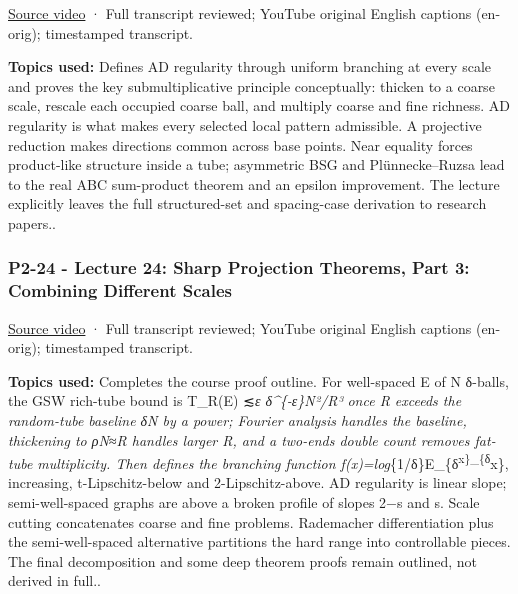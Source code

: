 \hypertarget{04-visual-computing-ii-ch036-p2-23---lecture-23-sharp-projection-theorems-part-2-ad-regular-case}{}

\href{https://www.youtube.com/watch?v=I6ZSrgxiofs}{Source video} · Full transcript reviewed; YouTube original English captions (en-orig); timestamped transcript.

\textbf{Topics used:} Defines AD regularity through uniform branching at every scale and proves the key submultiplicative principle conceptually: thicken to a coarse scale, rescale each occupied coarse ball, and multiply coarse and fine richness. AD regularity is what makes every selected local pattern admissible. A projective reduction makes directions common across base points. Near equality forces product-like structure inside a tube; asymmetric BSG and Plünnecke--Ruzsa lead to the real ABC sum-product theorem and an epsilon improvement. The lecture explicitly leaves the full structured-set and spacing-case derivation to research papers..

\subsubsection{P2-24 - Lecture 24: Sharp Projection Theorems, Part 3: Combining Different Scales}\label{04-visual-computing-ii-ch036-p2-24---lecture-24-sharp-projection-theorems-part-3-combining-different-scales}

\hypertarget{04-visual-computing-ii-ch036-p2-24---lecture-24-sharp-projection-theorems-part-3-combining-different-scales}{}

\href{https://www.youtube.com/watch?v=h0Ln82BR4R0}{Source video} · Full transcript reviewed; YouTube original English captions (en-orig); timestamped transcript.

\textbf{Topics used:} Completes the course proof outline. For well-spaced E of N δ-balls, the GSW rich-tube bound is \textbar T\_R(E)\textbar{} ≲\emph{ε δ\^{}\{-ε\}N²/R³ once R exceeds the random-tube baseline δN by a power; Fourier analysis handles the baseline, thickening to ρN≈R handles larger R, and a two-ends double count removes fat-tube multiplicity. Then defines the branching function f(x)=log}\{1/δ\}\textbar E\_\{δ\textsuperscript{x\}\textbar\_\{δ}x\}, increasing, t-Lipschitz-below and 2-Lipschitz-above. AD regularity is linear slope; semi-well-spaced graphs are above a broken profile of slopes 2−s and s. Scale cutting concatenates coarse and fine problems. Rademacher differentiation plus the semi-well-spaced alternative partitions the hard range into controllable pieces. The final decomposition and some deep theorem proofs remain outlined, not derived in full..

